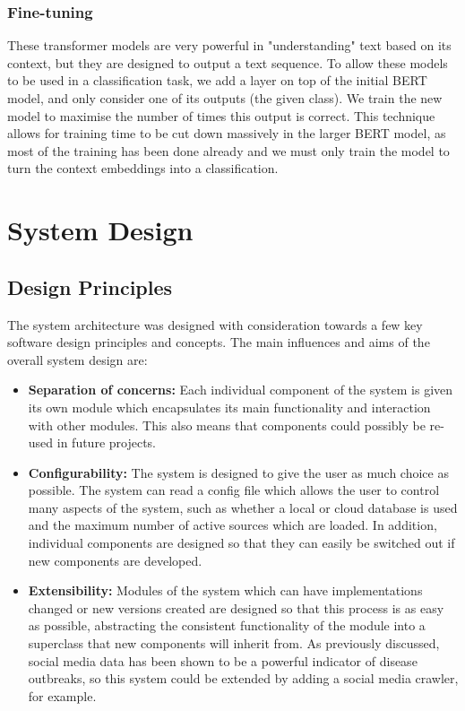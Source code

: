 \documentclass{l4proj}
\begin{document}
\subsection{Fine-tuning}
These transformer models are very powerful in "understanding" text based on its context, but they are designed to output a text sequence. To allow these models to be used in a classification task, we add a layer on top of the initial BERT model, and only consider one of its outputs (the given class). We train the new model to maximise the number of times this output is correct. This technique allows for training time to be cut down massively in the larger BERT model, as most of the training has been done already and we must only train the model to turn the context embeddings into a classification.




\chapter{System Design}
\section{Design Principles}
The system architecture was designed with consideration towards a few key software design principles and concepts. The main influences and aims of the overall system design are:
\begin{itemize}
    \item \textbf{Separation of concerns: } Each individual component of the system is given its own module which encapsulates its main functionality and interaction with other modules. This also means that components could possibly be re-used in future projects.
    \item \textbf{Configurability: } The system is designed to give the user as much choice as possible. The system can read a config file which allows the user to control many aspects of the system, such as whether a local or cloud database is used and the maximum number of active sources which are loaded. In addition, individual components are designed so that they can easily be switched out if new components are developed.
    \item \textbf{Extensibility: } Modules of the system which can have implementations changed or new versions created are designed so that this process is as easy as possible, abstracting the consistent functionality of the module into a superclass that new components will inherit from. As previously discussed, social media data has been shown to be a powerful indicator of disease outbreaks, so this system could be extended by adding a social media crawler, for example.
\end{itemize}
\end{document}
